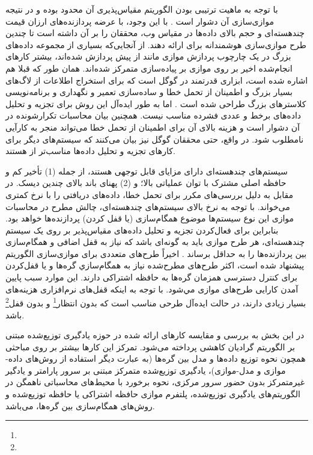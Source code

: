 با توجه به ماهیت ترتیبی بودن الگوریتم  مقیاس‌پذیری آن محدود بوده و در نتیجه موازی‌سازی آن دشوار است \cite{Hog12011}. با این وجود، با عرضه پردازنده‌های ارزان قیمت چندهسته‌ای و حجم بالای داده‌ها در مقیاس وب، محققان را بر آن داشته است تا چندین طرح موازی‌سازی هوشمندانه برای  ارائه دهند. از آنجایی‌که بسیاری از مجموعه‌ داده‌های بزرگ در یک چارچوب پردازش موازی مانند  از پیش‌ پردازش شده‌اند، بیشتر کارهای انجام‌شده اخیر بر روی  موازی بر پیاده‌سازی  متمرکز شده‌اند. همان طور که قبلا هم اشاره شده است،  ابزاری قدرتمند در گوگل است که برای استخراج اطلاعات از لاگ‌های بسیار بزرگ و اطمینان از تحمل خطا و ساده‌سازی تعمیر و نگهداری و برنامه‌نویسی کلاسترهای بزرگ طراحی شده است \cite{Gem2011}. اما به طور ایده‌آل این روش برای تجزیه و تحلیل داده‌های برخط و عددی فشرده مناسب نیست. همچنین بیان محاسبات تکرارشونده در آن دشوار است و هزینه بالای آن برای اطمینان از تحمل خطا می‌تواند منجر به کارآیی نامطلوب شود. در واقع، حتی محققان گوگل نیز بیان می‌کنند که سیستم‌های دیگر برای کارهای تجزیه و تحلیل داده‌ها مناسب‌تر از  هستند.  
 
 سیستم‌های چندهسته‌ای دارای مزایای قابل توجهی هستند، از جمله (1) تأخیر کم و حافظه اصلی مشترک با توان عملیاتی بالا؛ و (2) پهنای باند بالای چندین دیسک. در مقابل  به دلیل بررسی‌های مکرر برای تحمل خطا، داده‌های دریافتی را با نرخ کمتری می‌خواند. با توجه به نرخ‌ بالای سیستم‌های چندهسته‌ای، چالش مطرح در محاسبات موازی این نوع سیستم‌ها موضوع همگام‌سازی (یا قفل کردن) پردازنده‌ها خواهد بود. بنابراین برای فعال‌کردن تجزیه و تحلیل داده‌های مقیاس‌پذیر بر روی یک سیستم چندهسته‌ای، هر طرح موازی باید به گونه‌ای باشد که نیاز به قفل اضافی و همگام‌سازی بین پردازنده‌ها را به حداقل برساند \cite{ag2011}. اخیراً طرح‌های متعددی برای موازی‌سازی الگوریتم  پیشنهاد شده است، اكثر طرح‌های مطرح‌شده نیاز به همگام‌سازي گره‌ها و يا قفل‌کردن برای کنترل دسترسی همزمان گره‌ها به حافظه اشتراکی دارند. این موارد سبب پایین آمدن کارایی طرح‌های موازی مي‌شود. با توجه به اینکه قفل‌های نرم‌افزاری هزینه‌های بسیار زیادی دارند، در حالت ایده‌آل طرحی مناسب است که بدون انتظار\footnote{} و بدون قفل\footnote{} باشد.
 
 در این بخش به بررسی و مقایسه کارهای ارائه شده در حوزه یادگیری توزیع‌شده مبتنی بر الگوریتم گرادیان کاهشی پرداخته می‌شود. تمرکز این کارها بیشتر بر روی مباحثی همچون نحوه توزیع داده‌ها و مدل بین گره‌ها (به عبارت دیگر استفاده از روش‌های داده-موازی و مدل-موازی)، یادگیری توزیع‌شده متمرکز مبتنی بر سرور پارامتر و یادگیر غیرمتمرکز بدون حضور سرور مرکزی، نحوه برخورد با محیط‌های محاسباتی ناهمگن در الگوریتم‌های یادگیری توزیع‌شده، پلتفرم موازی حافظه اشتراکی یا حافظه توزیع‌شده و روش‌های همگام‌سازی بین گره‌ها، می‌باشد.
 
